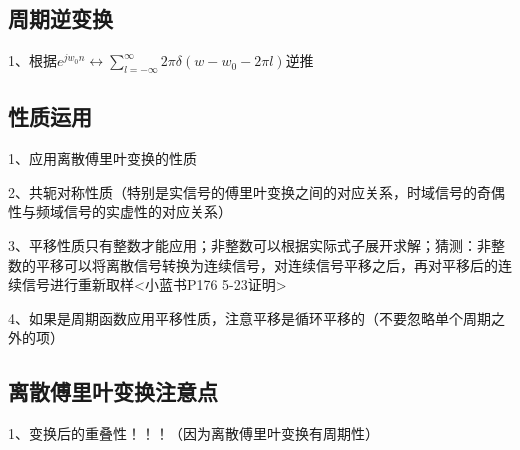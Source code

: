\subsection{周期逆变换}

1、根据$e^{jw_0n} \leftrightarrow \sum_{l=-\infty}^{\infty}2\pi \delta(w-w_0-2\pi l)$逆推



\subsection{性质运用}

1、应用离散傅里叶变换的性质

2、共轭对称性质（特别是实信号的傅里叶变换之间的对应关系，时域信号的奇偶性与频域信号的实虚性的对应关系）

3、平移性质只有整数才能应用；非整数可以根据实际式子展开求解；猜测：非整数的平移可以将离散信号转换为连续信号，对连续信号平移之后，再对平移后的连续信号进行重新取样<小蓝书P176 5-23证明>

4、如果是周期函数应用平移性质，注意平移是循环平移的（不要忽略单个周期之外的项）



\subsection{离散傅里叶变换注意点}

1、变换后的重叠性！！！（因为离散傅里叶变换有周期性）

